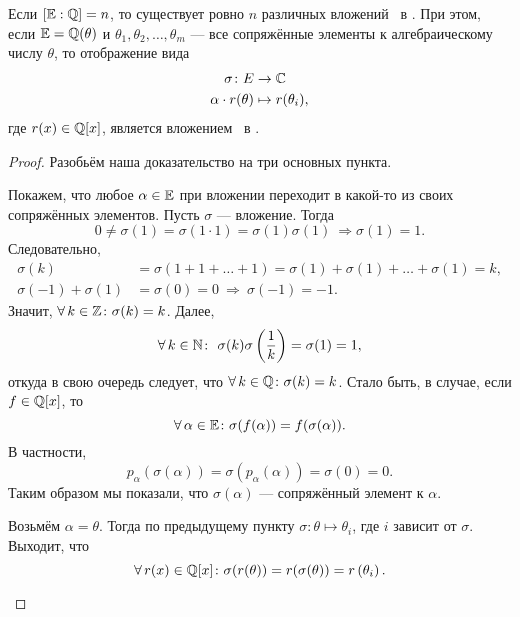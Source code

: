 \begin{ntheorem}
\label{thm:IV-7}
    Если $[\mathbb{E} : \mathbb{Q}] = n$, то существует ровно $n$ различных вложений \EE~в \CC. При этом, если $\mathbb{E} = \mathbb{Q}(\theta)$ и $\theta_1, \theta_2, \dots, \theta_m$ --- все сопряжённые элементы к алгебраическому числу $\theta$, то отображение вида
    \begin{align*}
        \sigma\colon E &\to \mathbb{C} \\ 
        \alpha \cdot r(\theta) &\mapsto r(\theta_i),
    \end{align*}
    где $r(x) \in \mathbb{Q}[x]$, является вложением \EE~в \CC.
\end{ntheorem}
\begin{proof}
    Разобьём наша доказательство на три основных пункта.
    \begin{statesp}
        \item
        Покажем, что любое $\alpha \in \mathbb{E}$ при вложении переходит в какой-то из своих сопряжённых элементов.
            Пусть $\sigma$ --- вложение. Тогда
            \[
                0 \ne \sigma(1) = \sigma(1 \cdot 1) = \sigma(1)\sigma(1) \ \Rightarrow \sigma(1) = 1.
            \]
            Следовательно,
            \begin{align*}
                \sigma(k) &= \sigma(1 + 1 + \dots + 1) = \sigma(1) + \sigma(1) + \dots + \sigma(1) = k, \\
                \sigma(-1) + \sigma(1) &= \sigma(0)=0 \ \Rightarrow \ \sigma(-1) = -1.
            \end{align*}
            Значит, $\forall k \in \ZZ\colon \sigma(k) = k$. Далее,
            \[
                \forall k \in \NN\colon \ \sigma(k)\sigma\left(\frac{1}{k}\right) = \sigma(1) = 1,
            \]
            откуда в свою очередь следует, что $\forall k \in \QQ\colon \sigma(k) = k$. Стало быть, в случае, если $f \in \mathbb{Q}[x]$, то
            \[
                \forall \alpha \in \EE\colon \sigma(f(\alpha)) = f(\sigma(\alpha)).
            \]
            В частности,
            \[
                p_{\alpha}(\sigma(\alpha)) = \sigma(p_\alpha(\alpha)) = \sigma(0) = 0.
            \]
            Таким образом мы показали, что $\sigma(\alpha)$ --- сопряжённый элемент к $\alpha$.
        \item
        Возьмём $\alpha = \theta$.
            Тогда по предыдущему пункту $\sigma\colon \theta \mapsto \theta_i$, где $i$ зависит от $\sigma$. Выходит, что
            \[
                \forall r(x) \in \QQ[x]\colon \sigma(r(\theta)) = r(\sigma(\theta)) = r\left( \theta_i \right).
            \]

\end{statesp}
\end{proof}
